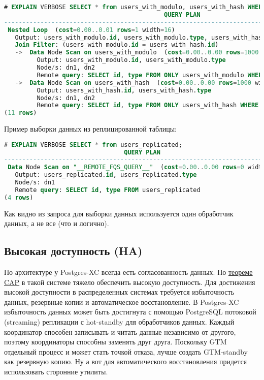 \begin{lstlisting}[language=SQL,label=lst:postgres-xc8,caption=Выборка записей из распределенной таблицы]
# EXPLAIN VERBOSE SELECT * from users_with_modulo, users_with_hash WHERE users_with_modulo.id = users_with_hash.id;
                                            QUERY PLAN
--------------------------------------------------------------------------------------------------
 Nested Loop  (cost=0.00..0.01 rows=1 width=16)
   Output: users_with_modulo.id, users_with_modulo.type, users_with_hash.id, users_with_hash.type
   Join Filter: (users_with_modulo.id = users_with_hash.id)
   ->  Data Node Scan on users_with_modulo  (cost=0.00..0.00 rows=1000 width=8)
         Output: users_with_modulo.id, users_with_modulo.type
         Node/s: dn1, dn2
         Remote query: SELECT id, type FROM ONLY users_with_modulo WHERE true
   ->  Data Node Scan on users_with_hash  (cost=0.00..0.00 rows=1000 width=8)
         Output: users_with_hash.id, users_with_hash.type
         Node/s: dn1, dn2
         Remote query: SELECT id, type FROM ONLY users_with_hash WHERE true
(11 rows)
\end{lstlisting}

Пример выборки данных из реплицированной таблицы:

\begin{lstlisting}[language=SQL,label=lst:postgres-xc22,caption=Выборка записей из реплицированной таблицы]
# EXPLAIN VERBOSE SELECT * from users_replicated;
                                 QUERY PLAN
----------------------------------------------------------------------------
 Data Node Scan on "__REMOTE_FQS_QUERY__"  (cost=0.00..0.00 rows=0 width=0)
   Output: users_replicated.id, users_replicated.type
   Node/s: dn1
   Remote query: SELECT id, type FROM users_replicated
(4 rows)
\end{lstlisting}

Как видно из запроса для выборки данных используется один обработчик данных, а не все (что и логично).

\subsection{Высокая доступность (HA)}

По архитектуре у Postgres-XC всегда есть согласованность данных. По \href{http://en.wikipedia.org/wiki/CAP\_theorem}{теореме CAP} в такой системе тяжело обеспечить высокую доступность. Для достижения высокой доступности в распределенных системах требуется избыточность данных, резервные копии и автоматическое восстановление. В Postgres-XC избыточность данных может быть достигнута с помощью PostgreSQL потоковой (streaming) репликации с hot-standby для обработчиков данных. Каждый координатор способен записывать и читать данные независимо от другого, поэтому координаторы способны заменять друг друга. Поскольку GTM отдельный процесс и может стать точкой отказа, лучше создать GTM-standby как резервную копию. Ну а вот для автоматического восстановления придется использовать сторонние утилиты.

